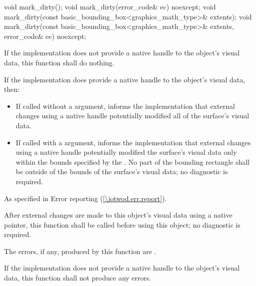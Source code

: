 %
\begin{itemdecl}
void mark_dirty();
void mark_dirty(error_code& ec) noexcept;
void mark_dirty(const basic_bounding_box<graphics_math_type>& extents);
void mark_dirty(const basic_bounding_box<graphics_math_type>& extents, error_code& ec) noexcept;
\end{itemdecl}
\begin{itemdescr}
\pnum
\effects
If the implementation does not provide a native handle to the  object's visual data, this function shall do nothing.

\pnum
If the implementation does provide a native handle to the  object's visual data, then:
\begin{itemize}
\item If called without a  argument, informs the implementation that external changes using a native handle potentially modified all of the surface's visual data.
\item If called with a  argument, informs the implementation that external changes using a native handle potentially modified the surface's visual data only within the bounds specified by the  . No part of the bounding rectangle shall be outside of the bounds of the surface's visual data; no diagnostic is required.
\end{itemize}

\pnum
\throws
As specified in Error reporting (\ref{\iotwod.err.report}).

\pnum
\remarks
After external changes are made to this  object's visual data using a native pointer, this function shall be called before using this  object; no diagnostic is required.

\pnum
\errors
The errors, if any, produced by this function are .

\pnum
If the implementation does not provide a native handle to the  object's visual data, this function shall not produce any errors.
\end{itemdescr}


